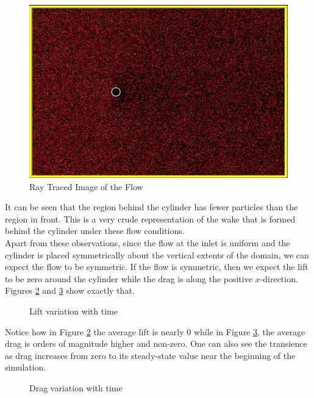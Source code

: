 \begin{figure}[H]
  \includegraphics[scale=0.4]{Pictures/Chapter_6_2D_Flow/dump.png}
  \centering
  \caption{Ray Traced Image of the Flow}
  \label{img:wake}
\end{figure}

\no It can be seen that the region behind the cylinder has fewer particles than the region in front. This is a very crude representation of the wake that is formed behind the cylinder under these flow conditions. \\

\no Apart from these observations, since the flow at the inlet is uniform and the cylinder is placed symmetrically about the vertical extents of the domain, we can expect the flow to be symmetric. If the flow is symmetric, then we expect the lift to be zero around the cylinder while the drag is along the positive $x$-direction. Figures \ref{gra:lift} and \ref{gra:drag} show exactly that.

\begin{figure}[H]
	\centering
    
    \caption{Lift variation with time}
	\label{gra:lift}
\end{figure}

\no Notice how in Figure \ref{gra:lift} the average lift is nearly 0 while in Figure \ref{gra:drag}, the average drag is orders of magnitude higher and non-zero. One can also see the transience as drag increases from zero to its steady-state value near the beginning of the simulation.

\begin{figure}[H]
	\centering
    
    \caption{Drag variation with time}
	\label{gra:drag}
\end{figure}